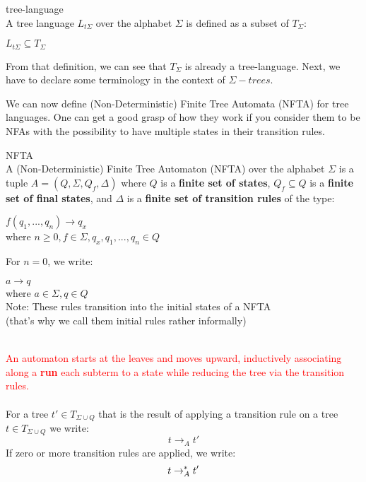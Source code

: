 \documentclass{llncs}
\begin{document}
\begin{definition}{tree-language \cite{automata-xml}}
	\\
	A tree language \(L_{t\Sigma}\) over the alphabet \(\Sigma\) is defined as a subset of \(T_\Sigma\):
	\begin{center}
		\(L_{t\Sigma} \subseteq T_\Sigma\)
	\end{center}	
\end{definition}

From that definition, we can see that \(T_\Sigma\) is already a tree-language.
Next, we have to declare some terminology in the context of $\Sigma-trees$.

\pagebreak
We can now define (Non-Deterministic) Finite Tree Automata (NFTA) for tree languages. One can get a good grasp of how they work if you consider them to be NFAs with the possibility to have multiple states in their transition rules.

\begin{definition}{NFTA \cite{tata-nfta}}
	\\
	A (Non-Deterministic) Finite Tree Automaton (NFTA) over the alphabet \(\Sigma\) is a tuple \(A = (Q, \Sigma, Q_f ,\Delta)\) where
	\(Q\) is a \textbf{finite set of states}, \(Q_f \subseteq Q\) is a  \textbf{finite set of final states}, and \(\Delta\) is a \textbf{finite set of transition rules} of the type:
	
	\begin{center}
		\(f(q_1,...,q_n) \rightarrow q_x\) \\
		where \(n \ge 0, f \in \Sigma, q_x, q_1,...,q_n \in Q \)
	\end{center}
	For \(n = 0\), we write:
	\begin{center}
		\(a \rightarrow q\) \\
		where  \(a \in \Sigma, q \in Q \) \\
		Note: These rules transition into the initial states of a NFTA
		\\(that's why we call them initial rules rather informally)
	\end{center}
	~\\
	\textcolor{red}{
	An automaton starts at
	the leaves and moves upward, inductively associating along a \textbf{run} each subterm to a state while reducing the tree via the transition rules.}
	\\\\
	For a tree $t' \in T_{\Sigma \cup Q}$ that is the result of applying a transition rule on a tree $t \in T_{\Sigma \cup Q}$ we write:
		$$t \rightarrow_A t'$$
	If zero or more transition rules are applied, we write:
		$$t \rightarrow_A^* t'$$
\end{definition}
\end{document}
